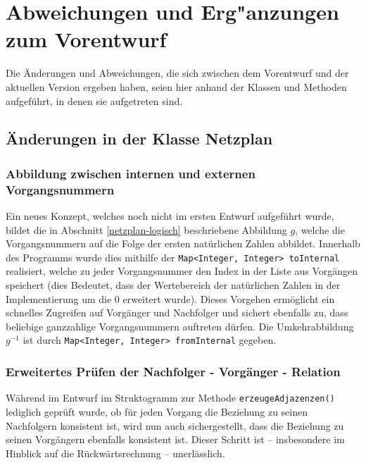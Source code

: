 \chapter[Abweichungen und Erg"anzungen zum Vorentwurf]{Abweichungen und Erg"anzungen\\zum Vorentwurf}
\label{Abweichungen}

Die \"Anderungen und Abweichungen, die sich zwischen dem Vorentwurf
und der aktuellen Version ergeben haben, seien hier anhand der Klassen
und Methoden aufgef\"uhrt, in denen sie aufgetreten sind.

\section{\"Anderungen in der Klasse Netzplan}

\subsection{Abbildung zwischen internen und externen Vorgangsnummern}

Ein neues Konzept, welches noch nicht im ersten Entwurf aufgef\"uhrt
wurde, bildet die in Abschnitt \ref{netzplan-logisch} beschriebene
Abbildung \(g\), welche die Vorgangsnummern auf die Folge der ersten
nat\"urlichen Zahlen abbildet. Innerhalb des Programms wurde dies
mithilfe der \texttt{Map<Integer, Integer> toInternal} realisiert,
welche zu jeder Vorgangsnummer den Index in der Liste aus Vorg\"angen
speichert (dies Bedeutet, dass der Wertebereich der nat\"urlichen
Zahlen in der Implementierung um die 0 erweitert wurde).
Dieses Vorgehen erm\"oglicht ein schnelles Zugreifen auf
Vorg\"anger und Nachfolger und sichert ebenfalls zu, dass beliebige
ganzzahlige Vorgangsnummern auftreten d\"urfen. Die Umkehrabbildung
\(g^{-1}\) ist durch \texttt{Map<Integer, Integer> fromInternal}
gegeben.

\subsection{Erweitertes Pr\"ufen der Nachfolger - Vorg\"anger -
  Relation}

W\"ahrend im Entwurf im Struktogramm zur Methode
\texttt{erzeugeAdjazenzen()} lediglich gepr\"uft wurde, ob f\"ur jeden
Vorgang die Beziehung zu seinen Nachfolgern konsistent ist, wird nun
auch sichergestellt, dass die Beziehung zu seinen Vorg\"angern
ebenfalls konsistent ist. Dieser Schritt ist -- insbesondere im
Hinblick auf die R\"uckw\"artsrechnung -- unerl\"asslich.

